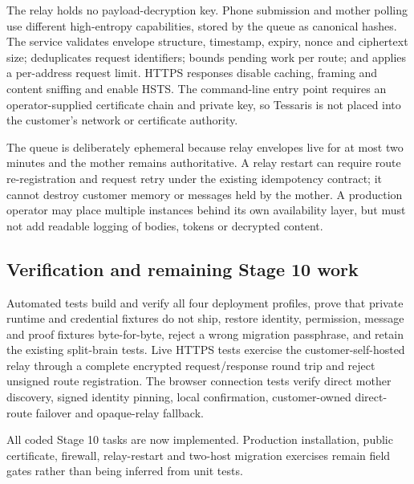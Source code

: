 The relay holds no payload-decryption key.  Phone submission and mother polling use
different high-entropy capabilities, stored by the queue as canonical hashes.  The
service validates envelope structure, timestamp, expiry, nonce and ciphertext size;
deduplicates request identifiers; bounds pending work per route; and applies a
per-address request limit.  HTTPS responses disable caching, framing and content
sniffing and enable HSTS.  The command-line entry point requires an operator-supplied
certificate chain and private key, so Tessaris is not placed into the customer's
network or certificate authority.

The queue is deliberately ephemeral because relay envelopes live for at most two
minutes and the mother remains authoritative.  A relay restart can require route
re-registration and request retry under the existing idempotency contract; it cannot
destroy customer memory or messages held by the mother.  A production operator may
place multiple instances behind its own availability layer, but must not add readable
logging of bodies, tokens or decrypted content.

\subsection{Verification and remaining Stage 10 work}

Automated tests build and verify all four deployment profiles, prove that private
runtime and credential fixtures do not ship, restore identity, permission, message
and proof fixtures byte-for-byte, reject a wrong migration passphrase, and retain the
existing split-brain tests.  Live HTTPS tests exercise the customer-self-hosted relay
through a complete encrypted request/response round trip and reject unsigned route
registration.  The browser connection tests verify direct mother
discovery, signed identity pinning, local confirmation, customer-owned direct-route
failover and opaque-relay fallback.

All coded Stage 10 tasks are now implemented.  Production installation, public
certificate, firewall, relay-restart and two-host migration exercises remain field
gates rather than being inferred from unit tests.
